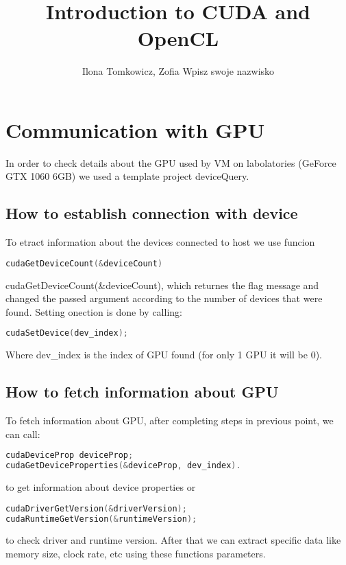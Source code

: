 \documentclass[12pt]{article}
\begin{document}
\title{Introduction to CUDA and OpenCL}
\author{Ilona Tomkowicz, Zofia Wpisz swoje nazwisko}

\maketitle
\tableofcontents
\newpage

\section{Communication with GPU} \label{gpu_communication}

In order to check details about the GPU used by VM on labolatories (GeForce GTX 1060 6GB) we used a template project deviceQuery.

\subsection{How to establish connection with device} \label{ht_open_connection}
To etract information about the devices connected to host we use funcion
\begin{lstlisting}[language=C]
cudaGetDeviceCount(&deviceCount)
\end{lstlisting} cudaGetDeviceCount(\&deviceCount), which returnes the flag message and changed the passed argument according to the number of devices that were found. Setting onection is done by calling:
\begin{lstlisting}[language=C]
cudaSetDevice(dev_index);
\end{lstlisting}
Where dev\_index is the index of GPU found (for only 1 GPU it will be 0).

\subsection{How to fetch information about GPU} \label{fetch_info}
To fetch information about GPU, after completing steps in previous point, we can call:
\begin{lstlisting}[language=C]
cudaDeviceProp deviceProp;
cudaGetDeviceProperties(&deviceProp, dev_index).
\end{lstlisting}
to get information about device properties or 
\begin{lstlisting}[language=C]
cudaDriverGetVersion(&driverVersion);
cudaRuntimeGetVersion(&runtimeVersion);
\end{lstlisting}
to check driver and runtime version.
After that we can extract specific data like memory size, clock rate, etc using these functions parameters.
\end{document}
